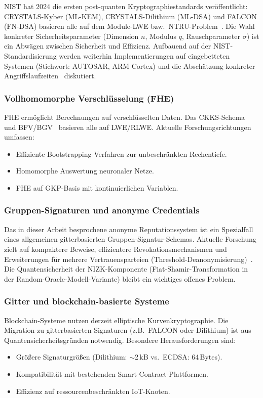 ﻿\documentclass[a4paper,12pt]{article}
\theoremstyle{definition}
\begin{document}
NIST hat 2024 die ersten post-quanten Kryptographiestandards veröffentlicht:
CRYSTALS-Kyber (ML-KEM), CRYSTALS-Dilithium (ML-DSA) und FALCON (FN-DSA)
basieren alle auf dem Module-LWE bzw.\ NTRU-Problem~\cite{NIST2024}.
Die Wahl konkreter Sicherheitsparameter (Dimension $n$, Modulus $q$, Rauschparameter $\sigma$)
ist ein Abwägen zwischen Sicherheit und Effizienz.
Aufbauend auf der NIST-Standardisierung werden weiterhin Implementierungen
auf eingebetteten Systemen (Stichwort: AUTOSAR, ARM Cortex)
und die Abschätzung konkreter Angriffslaufzeiten~\cite{Bai2021} diskutiert.

\subsubsection{Vollhomomorphe Verschlüsselung (FHE)}

FHE ermöglicht Berechnungen auf verschlüsselten Daten.
Das CKKS-Schema~\cite{CKKS2017} und BFV/BGV~\cite{BFV2012} basieren alle auf LWE/RLWE.
Aktuelle Forschungsrichtungen umfassen:
\begin{itemize}
    \item Effiziente Bootstrapping-Verfahren zur unbeschränkten Rechentiefe.
    \item Homomorphe Auswertung neuronaler Netze.
    \item FHE auf GKP-Basis mit kontinuierlichen Variablen.
\end{itemize}

\subsubsection{Gruppen-Signaturen und anonyme Credentials}

Das in dieser Arbeit besprochene anonyme Reputationssystem ist ein Spezialfall
eines allgemeinen gitterbasierten Gruppen-Signatur-Schemas.
Aktuelle Forschung zielt auf kompaktere Beweise, effizientere Revokationsmechanismen
und Erweiterungen für mehrere Vertrauensparteien (Threshold-Deanonymisierung)~\cite{Lyubashevsky2022}.
Die Quantensicherheit der NIZK-Komponente (Fiat-Shamir-Transformation in der
Random-Oracle-Modell-Variante) bleibt ein wichtiges offenes Problem.

\subsubsection{Gitter und blockchain-basierte Systeme}

Blockchain-Systeme nutzen derzeit elliptische Kurvenkryptographie.
Die Migration zu gitterbasierten Signaturen (z.B.\ FALCON oder Dilithium) ist
aus Quantensicherheitsgründen notwendig.
Besondere Herausforderungen sind:
\begin{itemize}
    \item Größere Signaturgrößen (Dilithium: $\sim$2\,kB vs.\ ECDSA: 64\,Bytes).
    \item Kompatibilität mit bestehenden Smart-Contract-Plattformen.
    \item Effizienz auf ressourcenbeschränkten IoT-Knoten.
\end{itemize}
\end{document}
